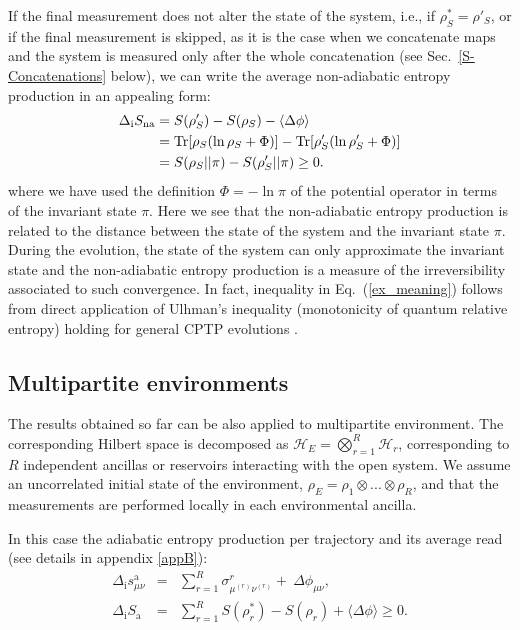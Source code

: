 \documentclass[aps,prx,twocolumn,showpacs,floatfix,superscriptaddress,graphics,longbibliography]{revtex4-1}
\newcommand{\tr}{\mathrm{Tr}}
\newcommand{\HAT}{}
\begin{document}
If the final measurement does not alter the state of the system, i.e., if $\rho_S^*=\rho'_S$, or if the final measurement is skipped, as it is the case when we concatenate maps and the system is measured only after the whole concatenation (see Sec.~\ref{S-Concatenations} below), we can write the average non-adiabatic entropy production in an appealing form:
\begin{align}\label{ex_meaning}
 \Delta_{\rm i} S_{\rm na} &= S(\rho_S')-S(\rho_S)-\langle \Delta \phi\rangle  \nonumber \\
 & = \tr [\rho_S(\ln\rho_S + \Phi)]-\tr [\rho_S'(\ln\rho_S'+ \Phi)] \nonumber \\ & = S(\rho_S ||\pi) - S(\rho_S'|| \pi) \geq 0.
\end{align}
where we have used the definition $\HAT{\Phi} =-\ln \pi$ of the potential operator in terms of the invariant state $\pi$.
Here we see  that the non-adiabatic entropy production is related to the distance between the state of the system and the invariant state $\pi$. 
During the evolution, the state of the system can only approximate the invariant state and the non-adiabatic entropy production is a measure of the irreversibility associated to such convergence. 
In fact, inequality in Eq.~(\ref{ex_meaning}) follows from direct application of Ulhman's inequality (monotonicity of quantum relative entropy) holding for general CPTP evolutions \cite{NielsenChuang,SagawaEntropies}.



\subsection{Multipartite environments}

The results obtained so far can be also applied to multipartite environment. 
The corresponding Hilbert space is decomposed as $\mathcal{H}_E = \bigotimes_{r= 1}^R \mathcal{H}_{r}$, corresponding to $R$ independent ancillas or reservoirs  interacting  
with the open system. We assume an uncorrelated  initial state of the environment, $\rho_E = \rho_1 \otimes ... \otimes \rho_R$, and that the measurements are performed locally in 
each environmental ancilla. 

In this case the adiabatic entropy production per trajectory and its average read (see details in appendix \ref{appB}):
\begin{eqnarray}
\Delta_\mathrm{i} s^{\mathrm{a}}_{\mu \nu} &=& \sum_{r=1}^R \sigma^r_{\mu^{(r)} \nu^{(r)}} + ~\Delta \phi_{\mu \nu},  \\
\Delta_\mathrm{i} S_\mathrm{ a} &=&  \sum_{r=1}^R  S(\rho_r^\ast) - S(\rho_r)  + \langle \Delta \phi \rangle \geq 0.
\end{eqnarray}
\end{document}

